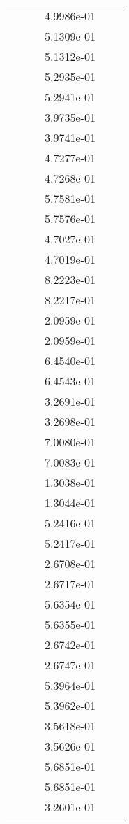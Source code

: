 \begin{xltabular}{\textwidth}{r|rS[table-format=1.3e+2]S[table-format=1.4e+2]S[table-format=1.4e+2]S[table-format=-1.5]}
&  &  & 4.9986e-01 & & \\
&  &  & 5.1309e-01 & & \\
&  &  & 5.1312e-01 & & \\
&  &  & 5.2935e-01 & & \\
&  &  & 5.2941e-01 & & \\
&  &  & 3.9735e-01 & & \\
&  &  & 3.9741e-01 & & \\
&  &  & 4.7277e-01 & & \\
&  &  & 4.7268e-01 & & \\
&  &  & 5.7581e-01 & & \\
&  &  & 5.7576e-01 & & \\
&  &  & 4.7027e-01 & & \\
&  &  & 4.7019e-01 & & \\
&  &  & 8.2223e-01 & & \\
&  &  & 8.2217e-01 & & \\
&  &  & 2.0959e-01 & & \\
&  &  & 2.0959e-01 & & \\
&  &  & 6.4540e-01 & & \\
&  &  & 6.4543e-01 & & \\
&  &  & 3.2691e-01 & & \\
&  &  & 3.2698e-01 & & \\
&  &  & 7.0080e-01 & & \\
&  &  & 7.0083e-01 & & \\
&  &  & 1.3038e-01 & & \\
&  &  & 1.3044e-01 & & \\
&  &  & 5.2416e-01 & & \\
&  &  & 5.2417e-01 & & \\
&  &  & 2.6708e-01 & & \\
&  &  & 2.6717e-01 & & \\
&  &  & 5.6354e-01 & & \\
&  &  & 5.6355e-01 & & \\
&  &  & 2.6742e-01 & & \\
&  &  & 2.6747e-01 & & \\
&  &  & 5.3964e-01 & & \\
&  &  & 5.3962e-01 & & \\
&  &  & 3.5618e-01 & & \\
&  &  & 3.5626e-01 & & \\
&  &  & 5.6851e-01 & & \\
&  &  & 5.6851e-01 & & \\
&  &  & 3.2601e-01 & & \\

\end{xltabular}

